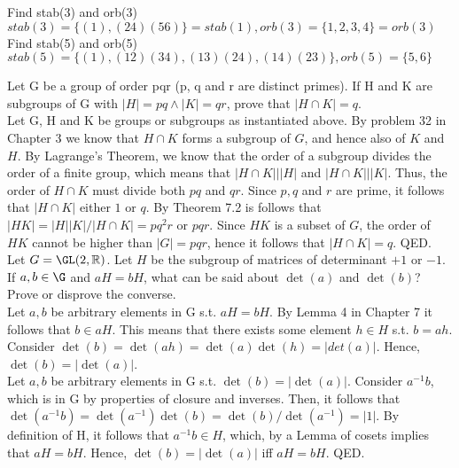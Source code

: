 \documentclass{article}
\newcommand{\R}{\mathbb{R}}
\begin{document}
Find stab(3) and orb(3)\\

$stab(3)=\{(1), (24)(56)\}=stab(1), orb(3)=\{1, 2, 3, 4\}=orb(3)$\\

Find stab(5) and orb(5)\\

$stab(5)=\{(1), (12)(34), (13)(24), (14)(23)\}, orb(5)=\{5, 6\}$\\

\newpage

 Let G be a group of order pqr (p, q and r are distinct primes). If H and K are subgroups of G with $|H|=pq \wedge |K|=qr$, prove that $|H\cap K|=q$. \\

 Let G, H and K be groups or subgroups as instantiated above. By problem 32 in Chapter 3 we know that $H \cap K$ forms a subgroup of $G$, and hence also of $K$ and $H$. By Lagrange's Theorem, we know that the order of a subgroup divides the order of a finite group, which means that $|H \cap K| \big| |H|$ and $|H \cap K| \big| |K|$. Thus, the order of $H \cap K$ must divide both $pq$ and $qr$. Since $p, q$ and $r$ are prime, it follows that $|H \cap K|$ either $1$ or $q$. By Theorem 7.2 is follows that $|HK|=|H||K| /|H \cap K| = pq^2r$ or $pqr$. Since $HK$ is a subset of $G$, the order of $HK$ cannot be higher than $|G|=pqr$, hence it follows that $|H \cap K|=q$.      QED.\\

 Let $G=\GL(2, \R)$. Let $H$ be the subgroup of matrices of determinant $+1$ or $-1$. If $a, b \in \G$ and $aH = bH$, what can be said about $\det(a)$ and $\det(b)$? Prove or disprove the converse. \\

 Let $a, b$ be arbitrary elements in G s.t. $aH=bH$. By Lemma 4 in Chapter 7 it follows that $b \in aH$. This means that there exists some element $h \in H$ s.t. $b = ah$. Consider $\det(b)=\det(ah)=\det(a)\det(h)=|det(a)|$. Hence, $\det(b)=|\det(a)|$. \\

 Let $a,b$ be arbitrary elements in G s.t. $\det(b)=|\det(a)|$. Consider $a^{-1}b$, which is in G by properties of closure and inverses. Then, it follows that $\det(a^{-1}b)=\det(a^{-1})\det(b)=\det(b)/\det(a^{-1})=|1|$. By definition of H, it follows that $a^{-1}b \in H$, which, by a Lemma of cosets implies that $aH = bH$. Hence, $\det(b)=|\det(a)|$ iff $aH = bH$. QED.\\
\end{document}
